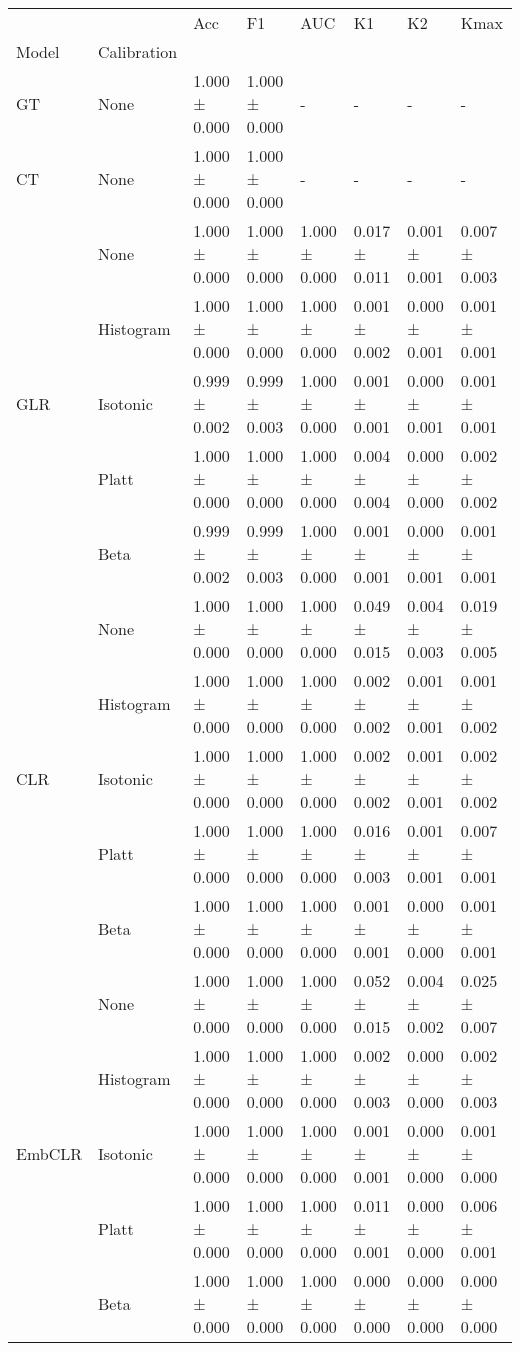 \begin{tabular}{llllllll}
\toprule
 &  & Acc & F1 & AUC & K1 & K2 & Kmax \\
Model & Calibration &  &  &  &  &  &  \\
\midrule
GT & None & 1.000 ± 0.000 & 1.000 ± 0.000 & - & - & - & - \\
\cline{1-8}
CT & None & 1.000 ± 0.000 & 1.000 ± 0.000 & - & - & - & - \\
\cline{1-8}
\multirow[t]{5}{*}{GLR} & None & 1.000 ± 0.000 & 1.000 ± 0.000 & 1.000 ± 0.000 & 0.017 ± 0.011 & 0.001 ± 0.001 & 0.007 ± 0.003 \\
 & Histogram & 1.000 ± 0.000 & 1.000 ± 0.000 & 1.000 ± 0.000 & 0.001 ± 0.002 & 0.000 ± 0.001 & 0.001 ± 0.001 \\
 & Isotonic & 0.999 ± 0.002 & 0.999 ± 0.003 & 1.000 ± 0.000 & 0.001 ± 0.001 & 0.000 ± 0.001 & 0.001 ± 0.001 \\
 & Platt & 1.000 ± 0.000 & 1.000 ± 0.000 & 1.000 ± 0.000 & 0.004 ± 0.004 & 0.000 ± 0.000 & 0.002 ± 0.002 \\
 & Beta & 0.999 ± 0.002 & 0.999 ± 0.003 & 1.000 ± 0.000 & 0.001 ± 0.001 & 0.000 ± 0.001 & 0.001 ± 0.001 \\
\cline{1-8}
\multirow[t]{5}{*}{CLR} & None & 1.000 ± 0.000 & 1.000 ± 0.000 & 1.000 ± 0.000 & 0.049 ± 0.015 & 0.004 ± 0.003 & 0.019 ± 0.005 \\
 & Histogram & 1.000 ± 0.000 & 1.000 ± 0.000 & 1.000 ± 0.000 & 0.002 ± 0.002 & 0.001 ± 0.001 & 0.001 ± 0.002 \\
 & Isotonic & 1.000 ± 0.000 & 1.000 ± 0.000 & 1.000 ± 0.000 & 0.002 ± 0.002 & 0.001 ± 0.001 & 0.002 ± 0.002 \\
 & Platt & 1.000 ± 0.000 & 1.000 ± 0.000 & 1.000 ± 0.000 & 0.016 ± 0.003 & 0.001 ± 0.001 & 0.007 ± 0.001 \\
 & Beta & 1.000 ± 0.000 & 1.000 ± 0.000 & 1.000 ± 0.000 & 0.001 ± 0.001 & 0.000 ± 0.000 & 0.001 ± 0.001 \\
\cline{1-8}
\multirow[t]{5}{*}{EmbCLR} & None & 1.000 ± 0.000 & 1.000 ± 0.000 & 1.000 ± 0.000 & 0.052 ± 0.015 & 0.004 ± 0.002 & 0.025 ± 0.007 \\
 & Histogram & 1.000 ± 0.000 & 1.000 ± 0.000 & 1.000 ± 0.000 & 0.002 ± 0.003 & 0.000 ± 0.000 & 0.002 ± 0.003 \\
 & Isotonic & 1.000 ± 0.000 & 1.000 ± 0.000 & 1.000 ± 0.000 & 0.001 ± 0.001 & 0.000 ± 0.000 & 0.001 ± 0.000 \\
 & Platt & 1.000 ± 0.000 & 1.000 ± 0.000 & 1.000 ± 0.000 & 0.011 ± 0.001 & 0.000 ± 0.000 & 0.006 ± 0.001 \\
 & Beta & 1.000 ± 0.000 & 1.000 ± 0.000 & 1.000 ± 0.000 & 0.000 ± 0.000 & 0.000 ± 0.000 & 0.000 ± 0.000 \\
\cline{1-8}
\bottomrule
\end{tabular}

